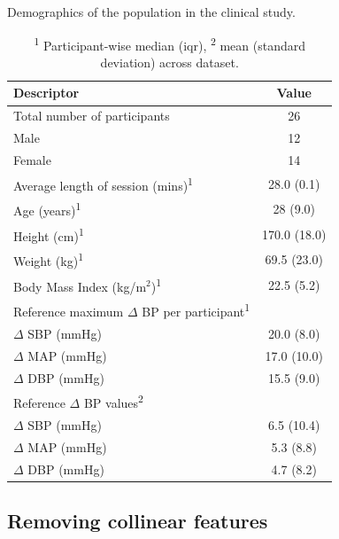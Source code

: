 \documentclass[fleqn,10pt]{wlscirep}
\begin{document}
\begin{table}[!hbt]
	\centering
	\caption{Demographics of the population in the clinical study. }
	\label{table:MOLLIE_demographics}
	\begin{tabular}{l | c}
	\hline
		\textbf{Descriptor} & \textbf{Value}  \\
		\hline
		Total number of participants & 26 \\
		\hspace*{0.5cm} Male & 12 \\
		\hspace*{0.5cm} Female & 14 \\
		Average length of session (mins)\textsuperscript{1} &  28.0 (0.1) \\
		Age (years)\textsuperscript{1} &  28 (9.0) \\
		Height (cm)\textsuperscript{1} &  170.0 (18.0) \\
		Weight (kg)\textsuperscript{1} &  69.5 (23.0) \\
		Body Mass Index (kg/m$^{2}$)\textsuperscript{1} &  22.5 (5.2) \\
		
		Reference maximum $\Delta$ BP per participant\textsuperscript{1} & \\
		\hspace*{0.5cm} $\Delta$ SBP (mmHg) & 20.0 (8.0)\\
		\hspace*{0.5cm} $\Delta$ MAP (mmHg) & 17.0 (10.0)\\
		\hspace*{0.5cm} $\Delta$ DBP (mmHg) & 15.5 (9.0)\\
		
		Reference $\Delta$ BP values\textsuperscript{2} & \\
		\hspace*{0.5cm} $\Delta$ SBP (mmHg) & 6.5 (10.4) \\
		\hspace*{0.5cm} $\Delta$ MAP (mmHg) & 5.3 (8.8)\\
		\hspace*{0.5cm} $\Delta$ DBP (mmHg) & 4.7 (8.2)\\
		
		
		\hline
	\end{tabular}
	\caption*{\textsuperscript{1} Participant-wise median (\ac{iqr}), \textsuperscript{2} mean (standard deviation) across dataset.}
\end{table}

\subsection{Removing collinear features}
\end{document}
